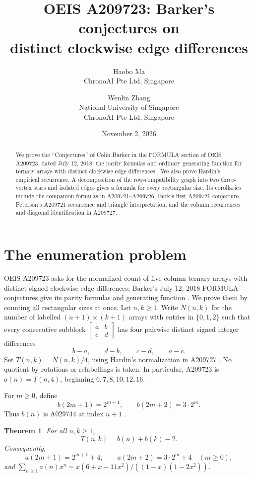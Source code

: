 \documentclass[11pt]{article}
\title{OEIS A209723: Barker's conjectures on\texorpdfstring{\\}{ }distinct clockwise edge differences}
\author{Haobo Ma\\{\small ChronoAI Pte Ltd, Singapore}\and
Wenlin Zhang\\{\small National University of Singapore}\\{\small ChronoAI Pte Ltd, Singapore}}
\date{November 2, 2026}
\newtheorem{theorem}{Theorem}
\begin{document}
\maketitle
\begin{abstract}
We prove the ``Conjectures'' of Colin Barker in the FORMULA section of
OEIS A209723, dated July 12, 2018: the parity formulas and ordinary generating
function for ternary arrays with distinct clockwise edge differences
\cite{a209723}. We also prove Hardin's empirical recurrence. A decomposition
of the row-compatibility graph into two three-vertex stars and isolated edges
gives a formula for every rectangular size. Its corollaries include the
companion formulas in A209721--A209726, Beck's first A209721 conjecture,
Peterson's A209721 recurrence and triangle interpretation, and the column
recurrences and diagonal identification in A209727.
\end{abstract}

\section{The enumeration problem}
OEIS A209723 asks for the normalized count of five-column ternary arrays
with distinct signed clockwise edge differences; Barker's July 12, 2018
FORMULA conjectures give its parity formulas and generating function
\cite{a209723}. We prove them by counting all rectangular sizes at once.
Let $n,k\geq1$. Write $N(n,k)$ for the number of labelled
$(n+1)\times(k+1)$ arrays with entries in $\{0,1,2\}$ such that every consecutive
subblock $\left[\begin{smallmatrix}a&b\\c&d\end{smallmatrix}\right]$ has four
pairwise distinct signed integer differences
\[
 b-a,\qquad d-b,\qquad c-d,\qquad a-c.
\]
Set $T(n,k)=N(n,k)/4$, using Hardin's normalization in
A209727 \cite{a209727}. No quotient by rotations or relabellings is taken.
In particular, A209723 is $a(n)=T(n,4)$, beginning $6,7,8,10,12,16$.

For $m\geq0$, define
\begin{equation}\label{eq:b}
 b(2m+1)=2^{m+1},\qquad b(2m+2)=3\cdot2^m.
\end{equation}
Thus $b(n)$ is A029744 at index $n+1$ \cite{a029744}.
\begin{theorem}\label{thm:main}
For all $n,k\geq1$,
\begin{equation}\label{eq:main}
 T(n,k)=b(n)+b(k)-2.
\end{equation}
Consequently,
\begin{equation}\label{eq:target}
 a(2m+1)=2^{m+1}+4,\qquad a(2m+2)=3\cdot2^m+4\quad(m\geq0),
\end{equation}
and $\sum_{n\geq1}a(n)x^n=x(6+x-11x^2)/((1-x)(1-2x^2))$.
\end{theorem}
\end{document}
